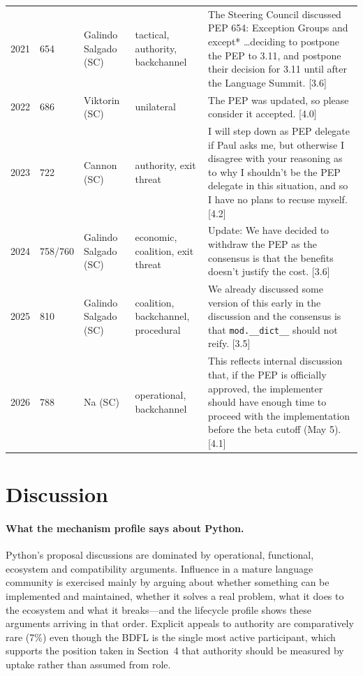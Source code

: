 \documentclass[sigconf,screen]{acmart}
\begin{document}
\begin{table}[t]
\begin{tabular}{p{}p{}p{}p{}p{}}
2021 & 654 & Galindo Salgado (SC) & tactical, authority, backchannel & The Steering Council discussed PEP 654: Exception Groups and except* \ldots deciding to postpone the PEP to 3.11, and postpone their decision for 3.11 until after the Language Summit. [3.6] \\
2022 & 686 & Viktorin (SC) & unilateral & The PEP was updated, so please consider it accepted. [4.0] \\
2023 & 722 & Cannon (SC) & authority, exit threat & I will step down as PEP delegate if Paul asks me, but otherwise I disagree with your reasoning as to why I shouldn't be the PEP delegate in this situation, and so I have no plans to recuse myself. [4.2] \\
2024 & 758/760 & Galindo Salgado (SC) & economic, coalition, exit threat & Update: We have decided to withdraw the PEP as the consensus is that the benefits doesn't justify the cost. [3.6] \\
2025 & 810 & Galindo Salgado (SC) & coalition, backchannel, procedural & We already discussed some version of this early in the discussion and the consensus is that \texttt{mod.\_\_dict\_\_} should not reify. [3.5] \\
2026 & 788 & Na (SC) & operational, backchannel & This reflects internal discussion that, if the PEP is officially approved, the implementer should have enough time to proceed with the implementation before the beta cutoff (May 5). [4.1] \\
\bottomrule
\end{tabular}
\end{table}

\section{Discussion}

\paragraph{What the mechanism profile says about Python.} Python's proposal discussions are dominated by operational, functional, ecosystem and compatibility arguments. Influence in a mature language community is exercised mainly by arguing about whether something can be implemented and maintained, whether it solves a real problem, what it does to the ecosystem and what it breaks---and the lifecycle profile shows these arguments arriving in that order. Explicit appeals to authority are comparatively rare (7\%) even though the BDFL is the single most active participant, which supports the position taken in Section~4 that authority should be measured by uptake rather than assumed from role.
\end{document}
